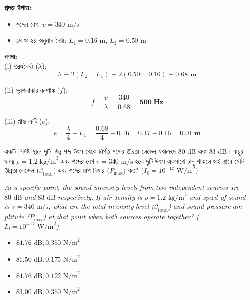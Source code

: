 \documentclass[12pt, a4paper]{article}
\begin{document}
\begin{tcolorbox}[solutionbox={সমাধান (Solution)}]
    \noindent
    \textbf{প্রদত্ত উপাত্ত:}
    \begin{itemize}[leftmargin=1.5em, itemsep=0.2em]
        \item শব্দের বেগ, $v = 340\text{ m/s}$
        \item ১ম ও ২য় অনুনাদ দৈর্ঘ্য: $L_1 = 0.16\text{ m}$, $L_2 = 0.50\text{ m}$
    \end{itemize}

    \vspace{0.6em}
    \noindent\textbf{গণনা:} \\
    (i) তরঙ্গদৈর্ঘ্য ($\lambda$):
    \[ \lambda = 2(L_2 - L_1) = 2(0.50 - 0.16) = \mathbf{0.68\text{ m}} \]
    
    (ii) সুরশলাকার কম্পাঙ্ক ($f$):
    \[ f = \frac{v}{\lambda} = \frac{340}{0.68} = \mathbf{500\text{ Hz}} \]
    
    (iii) প্রান্ত ত্রুটি ($e$):
    \[ e = \frac{\lambda}{4} - L_1 = \frac{0.68}{4} - 0.16 = 0.17 - 0.16 = \mathbf{0.01\text{ m}} \]
\end{tcolorbox}


\begin{tcolorbox}[questionbox={প্রশ্ন (Question) 19}]
    \noindent
    একটি নির্দিষ্ট স্থানে দুটি ভিন্ন শব্দ উৎস থেকে নির্গত শব্দের তীব্রতা লেভেল যথাক্রমে $80\text{ dB}$ এবং $83\text{ dB}$। বায়ুর ঘনত্ব $\rho = 1.2\text{ kg/m}^3$ এবং শব্দের বেগ $v = 340\text{ m/s}$ হলে দুটি উৎস একসাথে চালু থাকলে ওই স্থানে মোট তীব্রতা লেভেল ($\beta_{\text{total}}$) এবং শব্দের চাপ বিস্তার ($P_{\text{max}}$) কত? ($I_0 = 10^{-12}\text{ W/m}^2$)
    
    \vspace{0.8em}
    \begin{english}
    \noindent\textit{\color{darkgray}
    At a specific point, the sound intensity levels from two independent sources are $80\text{ dB}$ and $83\text{ dB}$ respectively. If air density is $\rho = 1.2\text{ kg/m}^3$ and speed of sound is $v = 340\text{ m/s}$, what are the total intensity level ($\beta_{\text{total}}$) and sound pressure amplitude ($P_{\text{max}}$) at that point when both sources operate together? ($I_0 = 10^{-12}\text{ W/m}^2$)
    }
    \end{english}
\end{tcolorbox}

\begin{itemize}[label={}, leftmargin=1cm, itemsep=0.5em]
    \item[\textbf{A)}] $84.76\text{ dB}, 0.350\text{ N/m}^2$
    \item[\textbf{B)}] $81.50\text{ dB}, 0.175\text{ N/m}^2$
    \item[\textbf{C)}] $84.76\text{ dB}, 0.122\text{ N/m}^2$
    \item[\textbf{D)}] $83.00\text{ dB}, 0.350\text{ N/m}^2$
\end{itemize}
\end{document}
